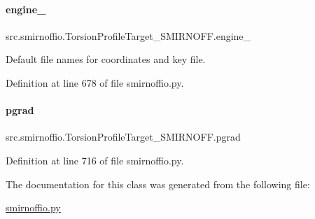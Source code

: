 \paragraph{\texorpdfstring{engine\+\_\+}{engine\_}}
{\footnotesize\ttfamily src.\+smirnoffio.\+Torsion\+Profile\+Target\+\_\+\+S\+M\+I\+R\+N\+O\+F\+F.\+engine\+\_\+}



Default file names for coordinates and key file. 



Definition at line 678 of file smirnoffio.\+py.

\mbox{\label{classsrc_1_1smirnoffio_1_1TorsionProfileTarget__SMIRNOFF_a62f3149e6c6b25396d4ba7a7748ac6d1}} 
\paragraph{\texorpdfstring{pgrad}{pgrad}}
{\footnotesize\ttfamily src.\+smirnoffio.\+Torsion\+Profile\+Target\+\_\+\+S\+M\+I\+R\+N\+O\+F\+F.\+pgrad}



Definition at line 716 of file smirnoffio.\+py.



The documentation for this class was generated from the following file\+:\begin{DoxyCompactItemize}
\item 
\hyperlink{smirnoffio_8py}{smirnoffio.\+py}\end{DoxyCompactItemize}

